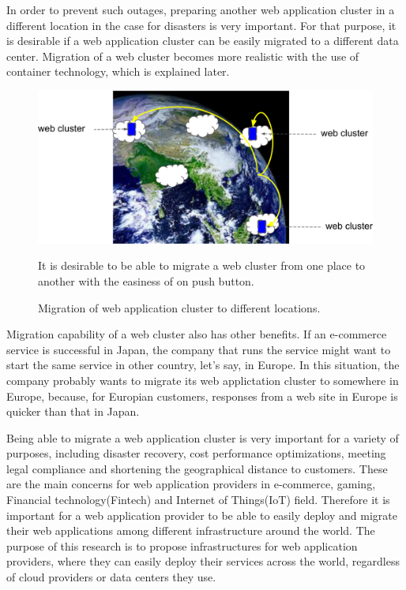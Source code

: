 In order to prevent such outages, preparing another web application cluster in a different location in the case for disasters is very important.
For that purpose, it is desirable if a web application cluster can be easily migrated to a different data center.
Migration of a web cluster becomes more realistic with the use of container technology, which is explained later.

\begin{figure}[h]
\begin{center}
\includegraphics[width=0.7\columnwidth]{Figs/earth}
\end{center}
\caption{
Migration of web application cluster to different locations.
}
\centering\parbox[c]{0.9\columnwidth}{
It is desirable to be able to migrate a web cluster from one place to another with the easiness of on push button.
}
\label{fig:earth}
\end{figure}

Migration capability of a web cluster also has other benefits.
If an e-commerce service is successful in Japan, the company that runs the service might want to start the same service in other country, let's say, in Europe.
In this situation, the company probably wants to migrate its web applictation cluster to somewhere in Europe, because, for Europian customers, responses from a web site in Europe is quicker than that in Japan.

Being able to migrate a web application cluster is very important for a variety of purposes, including disaster recovery, cost performance optimizations, meeting legal compliance and shortening the geographical distance to customers.
These are the main concerns for web application providers in e-commerce, gaming, Financial technology(Fintech) and Internet of Things(IoT) field.
Therefore it is important for a web application provider to be able to easily deploy and migrate their web applications among different infrastructure around the world.
The purpose of this research is to propose infrastructures for web application providers, where they can easily deploy their services across the world, regardless of cloud providers or data centers they use.


